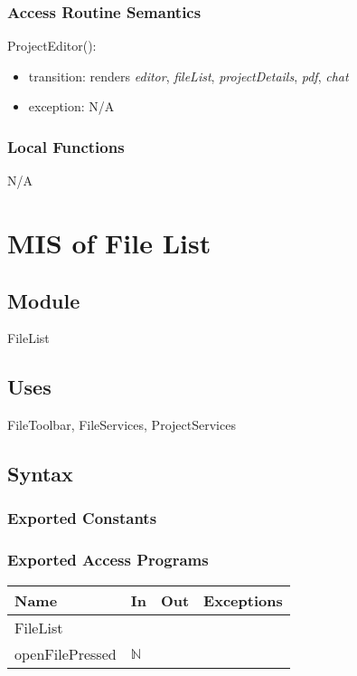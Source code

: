 \documentclass[12pt, titlepage]{article}
\begin{document}
	\subsubsection{Access Routine Semantics}
	
	\noindent ProjectEditor():
	\begin{itemize}
		\item transition: renders \textit{editor}, \textit{fileList}, \textit{projectDetails}, \textit{pdf}, \textit{chat}
		\item exception: N/A
	\end{itemize}
	
	\subsubsection{Local Functions}
	
	N/A
	
	\newpage
	
	\section{MIS of File List} \label{Module} 
	
	\subsection{Module}
	
	FileList
	
	\subsection{Uses}
	FileToolbar, FileServices, ProjectServices
	
	\subsection{Syntax}
	
	\subsubsection{Exported Constants}
	
	\subsubsection{Exported Access Programs}
	
	\begin{center}
		\begin{tabular}{p{4cm} p{2cm} p{2cm} p{2cm}}
			\hline
			\textbf{Name} & \textbf{In} & \textbf{Out} & \textbf{Exceptions} \\
			\hline
			FileList  & ~ &  & ~ \\
			\hline
			openFilePressed & $\mathbb{N}$ & ~ & ~ \\
			\hline
		\end{tabular}
	\end{center}
	
\end{document}
